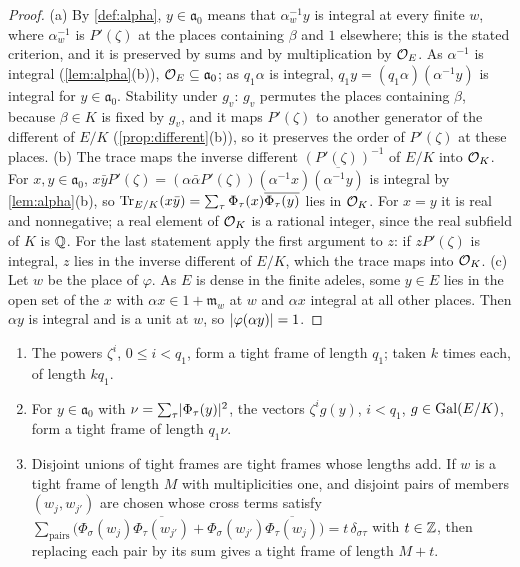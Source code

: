 \begin{proof}
(a) By \cref{def:alpha}, $y\in\mathfrak a_0$ means that $\alpha_w^{-1}y$ is integral at every finite $w$, where $\alpha_w^{-1}$ is $P'(\zeta)$ at the places containing $\beta$ and $1$ elsewhere; this is the stated criterion, and it is preserved by sums and by multiplication by $\mathcal{O}_E$. As $\alpha^{-1}$ is integral (\cref{lem:alpha}(b)), $\mathcal{O}_E\subseteq\mathfrak a_0$; as $q_1\alpha$ is integral, $q_1y=(q_1\alpha)(\alpha^{-1}y)$ is integral for $y\in\mathfrak a_0$. Stability under $g_v$: $g_v$ permutes the places containing $\beta$, because $\beta\in K$ is fixed by $g_v$, and it maps $P'(\zeta)$ to another generator of the different of $E/K$ (\cref{prop:different}(b)), so it preserves the order of $P'(\zeta)$ at these places.
(b) The trace maps the inverse different $(P'(\zeta))^{-1}$ of $E/K$ into $\mathcal{O}_K$. For
$x,y\in\mathfrak a_0$, $x\bar yP'(\zeta)=(\alpha\bar\alpha P'(\zeta))(\alpha^{-1}x)\overline{(\alpha^{-1}y)}$
is integral by \cref{lem:alpha}(b), so $\operatorname{Tr}_{E/K}(x\bar y)=\sum_\tau\Phi_\tau(x)\overline{\Phi_\tau(y)}$ lies in
$\mathcal{O}_K$. For $x=y$ it is real and nonnegative; a real element of $\mathcal{O}_K$ is a rational integer, since
the real subfield of $K$ is $\mathbb{Q}$. For the last statement apply the first argument to $z$: if $zP'(\zeta)$ is integral, $z$ lies in the inverse different of $E/K$, which the trace maps into $\mathcal{O}_K$. (c) Let $w$ be the place of $\varphi$. As $E$ is dense in the finite adeles, some $y\in E$ lies in the open set of the $x$ with $\alpha x\in1+\mathfrak m_w$ at $w$ and $\alpha x$ integral at all other places. Then $\alpha y$ is integral and is a unit at $w$, so $\lvert \varphi(\alpha y)\rvert=1$.
\end{proof}

\begin{lemma}\label{lem:frames-zeta}
\begin{enumerate}[label=\textup{(\alph*)}]
\item The powers $\zeta^i$, $0\le i<q_1$, form a tight frame of length $q_1$; taken $k$ times each,
of length $kq_1$.
\item For $y\in\mathfrak a_0$ with $\nu=\sum_\tau\lvert \Phi_\tau(y)\rvert^2$, the vectors $\zeta^ig(y)$,
$i<q_1$, $g\in\operatorname{Gal}(E/K)$, form a tight frame of length $q_1\nu$.
\item Disjoint unions of tight frames are tight frames whose lengths add. If $w$ is a tight frame of
length $M$ with multiplicities one, and disjoint pairs of members $(w_{j},w_{j'})$ are chosen whose
cross terms satisfy $\sum_{\text{pairs}}\bigl(\Phi_\sigma(w_j)\overline{\Phi_\tau(w_{j'})}+
\Phi_\sigma(w_{j'})\overline{\Phi_\tau(w_j)}\bigr)=t\,\delta_{\sigma\tau}$ with $t\in\mathbb{Z}$, then replacing
each pair by its sum gives a tight frame of length $M+t$.
\end{enumerate}
\end{lemma}

